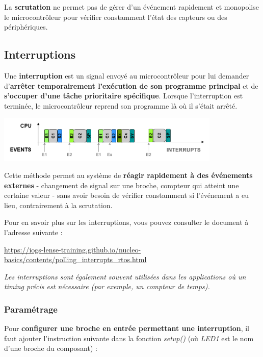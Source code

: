 \documentclass[a4paper,11pt,titlepage]{article} %
\begin{document}
La \textbf{scrutation} ne permet pas de gérer d'un événement rapidement et monopolise le microcontrôleur pour vérifier constamment l'état des capteurs ou des périphériques.


\subsection{Interruptions}

Une \textbf{interruption} est un signal envoyé au microcontrôleur pour lui demander d'\textbf{arrêter temporairement l'exécution de son programme principal} et de \textbf{s'occuper d'une tâche prioritaire spécifique}. Lorsque l'interruption est terminée, le microcontrôleur reprend son programme là où il s'était arrêté.

\begin{center}
	\includegraphics[width=0.8\textwidth]{images/gen_isr.png}
\end{center}


Cette méthode permet au système de \textbf{réagir rapidement à des événements externes} - changement de signal sur une broche, compteur qui atteint une certaine valeur - sans avoir besoin de vérifier constamment si l'événement a eu lieu, contrairement à la scrutation. 

Pour en savoir plus sur les interruptions, vous pouvez consulter le document à l'adresse suivante :

\href{https://iogs-lense-training.github.io/nucleo-basics/contents/polling_interrupts_rtos.html}{https://iogs-lense-training.github.io/nucleo-basics/contents/polling\_interrupts\_rtos.html}

\textit{Les interruptions sont également souvent utilisées dans les applications où un timing précis est nécessaire (par exemple, un compteur de temps).}


\subsubsection{Paramétrage}

Pour \textbf{configurer une broche en entrée permettant une interruption}, il faut ajouter l'instruction suivante dans la fonction \textsl{setup()} (où \textsl{LED1} est le nom d'une broche du composant) :
\end{document}
